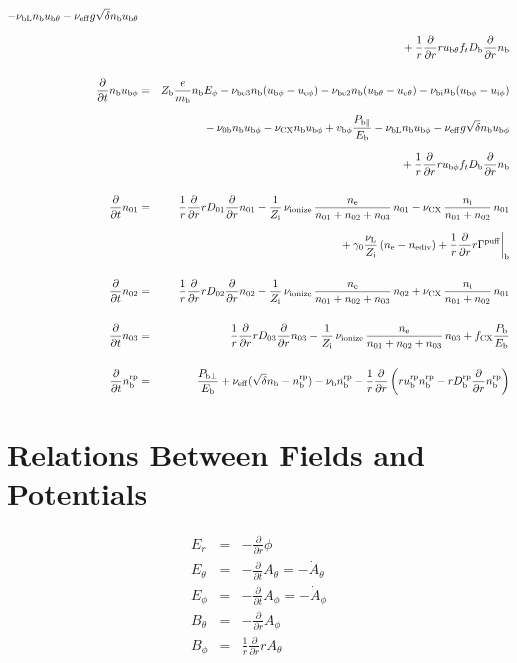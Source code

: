 \documentclass[11pt]{article}
\def\r#1{{\rm#1}}
\def\ddt{\frac{\partial}{\partial t}}
\def\ddr{\frac{\partial}{\partial r}}
\def\mb{m_\r{b}}
\def\nee{n_\r{e}}
\def\ni{n_\r{i}}
\def\nb{n_\r{b}}
\def\ueth{u_{\r{e}\theta}}
\def\ubth{u_{\r{b}\theta}}
\def\ueph{u_{\r{e}\phi}}
\def\uiph{u_{\r{i}\phi}}
\def\ubph{u_{\r{b}\phi}}
\def\Er{E_r}
\def\Eth{E_\theta}
\def\Eph{E_\phi}
\def\Bth{B_\theta}
\def\Bph{B_\phi}
\def\Athd{\dot{A}_\theta}
\def\Aphd{\dot{A}_\phi}
\def\Ath{A_\theta}
\def\Aph{A_\phi}
\def\nna{n_{01}}
\def\nnb{n_{02}}
\def\nnc{n_{03}}
\def\Zi{Z_\r{i}}
\def\Zb{Z_\r{b}}
\def\Pb{P_\r{b}}
\def\Eb{E_\r{b}}
\def\nbrp{n_\r{b}^\r{rp}}
\def\Pbpara{P_{\r{b}\parallel}}
\def\Pbperp{P_{\r{b}\perp}}
\def\nueff{\nu_\r{eff}}
\def\ubrp{u_\r{b}^\r{rp}}
\def\Dbrp{D_\r{b}^\r{rp}}
\def\Db{D_\r{b}}
\def\fCX{f_\r{CX}}
\def\nubi{\nu_\r{bi}}
\def\nunb{\nu_\r{0b}}
\def\nuL{\nu_\r{L}}
\def\nuCX{\nu_\r{CX}}
\def\nuion{\nu_\r{ionize}}
\def\nub{\nu_\r{b}}
\def\nediv{n_\r{ediv}}
\def\nubL{\nu_\r{bL}}
\def\vbph{v_{\r{b}\phi}}
\begin{document}
\begin{eqnarray}
%
  - \nubL \nb \ubth
%
  - \nueff g \sqrt{\delta} \nb \ubth
\nonumber\\[2.5mm]&&{}
%
  + \frac{1}{r} \ddr r \ubth f_t \Db \ddr \nb
\\[5mm]
  \ddt \nb \ubph &=&
%
  \Zb \frac{e}{\mb} \nb \Eph
%
  - \nu_\r{be3} \nb (\ubph - \ueph)
%
  - \nu_\r{be2} \nb (\ubth - \ueth)
%
  - \nubi \nb (\ubph - \uiph)
\nonumber\\[2.5mm]&&{}
%
  - \nunb \nb \ubph
%
  - \nuCX \nb \ubph
%
  + \vbph \frac{\Pbpara}{\Eb}
%
  - \nubL \nb \ubph
%
  - \nueff g \sqrt{\delta} \nb \ubph
\nonumber\\[2.5mm]&&{}
%
  + \frac{1}{r} \ddr r \ubph f_t \Db \ddr \nb
\\[5mm]
  \ddt \nna &=& 
%
    \frac{1}{r} \ddr r D_{01} \ddr \nna
%
  - \frac{1}{\Zi}\, \nuion\, \frac{\nee}{\nna + \nnb + \nnc}\, \nna
%
  - \nuCX\, \frac{\ni}{\nna + \nnb}\, \nna
\nonumber\\[2.5mm]&&{}
%
  + \gamma_0 \frac{\nuL}{\Zi} \, (\nee - \nediv)
%
  + \frac{1}{r} \ddr r \Gamma^\r{puff}\biggr|_\r{b}
\\[5mm]
  \ddt \nnb &=& 
%
    \frac{1}{r} \ddr r D_{02} \ddr \nnb
%
  - \frac{1}{\Zi}\, \nuion\, \frac{\nee}{\nna + \nnb + \nnc}\, \nnb
%
  + \nuCX\, \frac{\ni}{\nna + \nnb}\, \nna
%
\\[5mm]
  \ddt \nnc &=& 
%
    \frac{1}{r} \ddr r D_{03} \ddr \nnc
%
  - \frac{1}{\Zi}\, \nuion\, \frac{\nee}{\nna + \nnb + \nnc}\, \nnc
%
  + \fCX \frac{\Pb}{\Eb}
\\[5mm]
  \ddt \nbrp &=&
%
    \frac{\Pbperp}{\Eb}
%
  + \nueff (\sqrt{\delta} \nb - \nbrp)
%
  - \nub \nbrp
%
  - \frac{1}{r} \ddr \left( r \ubrp \nbrp - r \Dbrp \ddr \nbrp \right)
%
\end{eqnarray}

\bigskip

\section{Relations Between Fields and Potentials}
\setcounter{equation}{0}

\begin{eqnarray}
  \Er &=&
%
  - \ddr \phi
\\[5mm]
  \Eth &=&
%
  - \ddt \Ath = - \Athd
\\[5mm]
  \Eph &=&
%
  - \ddt \Aph = - \Aphd
\\[5mm]
  \Bth &=&
%
  - \ddr \Aph
\\[5mm]
  \Bph &=&
%
  \frac{1}{r} \ddr r \Ath
\end{eqnarray}
\end{document}

